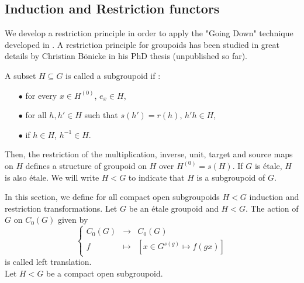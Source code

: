 \subsection{Induction and Restriction functors}

We develop a restriction principle in order to apply the "Going Down" technique developed in \cite{ChabertEOY}. A restriction principle for groupoids has been studied in great details by Christian Bönicke in his PhD thesis (unpublished so far).

\begin{definition} A subset $H\subseteq G$ is called a subgroupoid if :
\begin{itemize}
\item[$\bullet$] for every $x\in H^{(0)}$, $e_x\in H$,
\item[$\bullet$] for all $h,h'\in H $ such that $s(h') = r(h)$, $h'h \in H$,
\item[$\bullet$] if $h\in H$, $h^{-1}\in H$.
\end{itemize}
Then, the restriction of the multiplication, inverse, unit, target and source maps on $H$ defines a structure of groupoid on $H$ over $H^{(0)} = s(H)$. If $G$ is étale, $H$ is also étale. We will write $H< G$ to indicate that $H$ is a subgroupoid of $G$.
\end{definition}

In this section, we define for all compact open subgroupoids $H < G$ induction and restriction transformations. Let $G$ be an étale groupoid and $H<G$. The action of $G$ on $C_0(G)$ given by 
\[\left\{ \begin{array}{rcl}
C_0(G) & \rightarrow & C_0(G) \\
f & \mapsto  & [x\in G^{s(g)}\mapsto f(gx) ]
\end{array}\right.\] 
is called left translation.\\

Let $H < G$ be a compact open subgroupoid.\\


